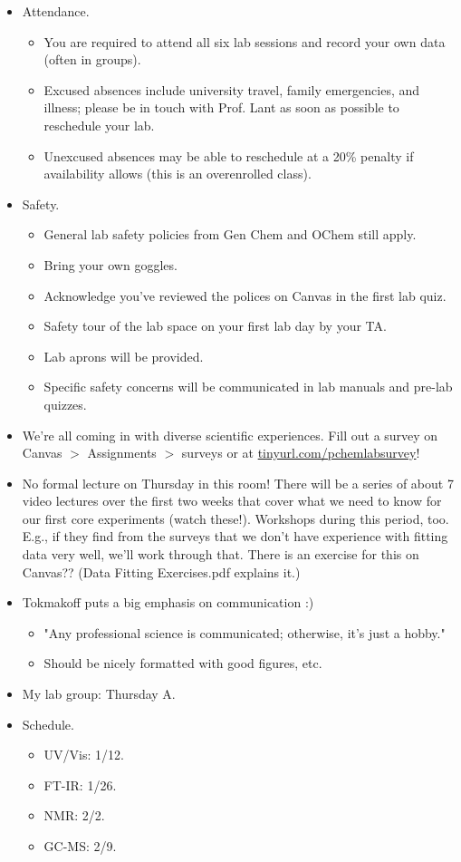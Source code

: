 \documentclass[../notes.tex]{subfiles}
\begin{document}
\begin{itemize}
    \item Attendance.
    \begin{itemize}
        \item You are required to attend all six lab sessions and record your own data (often in groups).
        \item Excused absences include university travel, family emergencies, and illness; please be in touch with Prof. Lant as soon as possible to reschedule your lab.
        \item Unexcused absences may be able to reschedule at a 20\% penalty if availability allows (this is an overenrolled class).
    \end{itemize}
    \item Safety.
    \begin{itemize}
        \item General lab safety policies from Gen Chem and OChem still apply.
        \item Bring your own goggles.
        \item Acknowledge you've reviewed the polices on Canvas in the first lab quiz.
        \item Safety tour of the lab space on your first lab day by your TA.
        \item Lab aprons will be provided.
        \item Specific safety concerns will be communicated in lab manuals and pre-lab quizzes.
    \end{itemize}
    \item We're all coming in with diverse scientific experiences. Fill out a survey on Canvas $>$ Assignments $>$ surveys or at \href{https://www.tinyurl.com/pchemlabsurvey}{tinyurl.com/pchemlabsurvey}!
    \item No formal lecture on Thursday in this room! There will be a series of about 7 video lectures over the first two weeks that cover what we need to know for our first core experiments (watch these!). Workshops during this period, too. E.g., if they find from the surveys that we don't have experience with fitting data very well, we'll work through that. There is an exercise for this on Canvas?? (Data Fitting Exercises.pdf explains it.)
    \item Tokmakoff puts a big emphasis on communication :)
    \begin{itemize}
        \item "Any professional science is communicated; otherwise, it's just a hobby."
        \item Should be nicely formatted with good figures, etc.
    \end{itemize}
    \item My lab group: Thursday A.
    \item Schedule.
    \begin{itemize}
        \item UV/Vis: 1/12.
        \item FT-IR: 1/26.
        \item NMR: 2/2.
        \item GC-MS: 2/9.
    \end{itemize}
\end{itemize}
\end{document}
